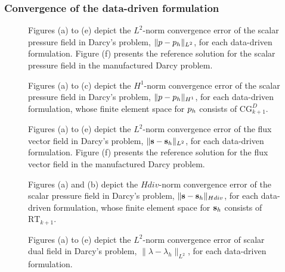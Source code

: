 \clearpage
\subsubsection{Convergence of the data-driven formulation}\label{sec:convergence_ddcm}


\begin{figure}[h!]
	\centering
	\caption{Figures (a) to (e) depict the $ L^{2} $-norm convergence error of the scalar pressure field in Darcy's problem, $ \|p-p_h\|_{L^{2}} $, for each data-driven formulation. Figure (f) presents the reference solution for the scalar pressure field in the manufactured Darcy problem.}
	\def\svgwidth{1,0\linewidth}  
	  
	\label{fig:DNLSP1_conv_u_L2}  
\end{figure}

\begin{figure}[h!]
	\centering
	\caption{Figures (a) to (c) depict the $ H^{1} $-norm convergence error of the scalar pressure field in Darcy's problem, $ \|p-p_h\|_{H^{1}} $, for each data-driven formulation, whose finite element space for $ p_h $ consists of $ \text{CG}_{k+1}^{D} $.}
	\def\svgwidth{\columnwidth}  
	  
	\label{fig:DNLSP1_conv_u_H1}  
\end{figure}

\begin{figure}[h!]
	\centering
	\caption{Figures (a) to (e) depict the $ L^{2}$-norm convergence error of the flux vector field in Darcy's problem, $ \|\mathbf{s}-\mathbf{s}_h\|_{L^{2}} $, for each data-driven formulation. Figure (f) presents the reference solution for the flux vector field in the manufactured Darcy problem.}
	\def\svgwidth{\columnwidth}  
	  
	\label{fig:DNLSP1_conv_s_L2}  
\end{figure}

\begin{figure}[h!]
	\centering
	\caption{Figures (a) and (b) depict the $Hdiv$-norm convergence error of the scalar pressure field in Darcy's problem, $ \|\mathbf{s}-\mathbf{s}_h\|_{Hdiv} $, for each data-driven formulation, whose finite element space for $ \mathbf{s}_h $ consists of $ \text{RT}_{k+1} $.}
	\def\svgwidth{\columnwidth}  
	  
	\label{fig:DNLSP1_conv_s_Hdiv}  
\end{figure}


\begin{figure}[h!]
	\centering
	\caption{Figures (a) to (e) depict the $ L^{2}$-norm convergence error of scalar dual field in Darcy's problem, $ \|\lambda-\lambda_h\|_{L^{2}} $, for each data-driven formulation.}
	\def\svgwidth{\columnwidth}  
	  
	\label{fig:DNLSP1_conv_lambda_L2}  
\end{figure}

